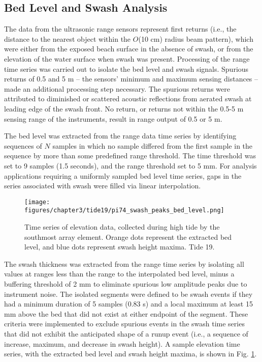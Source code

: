 \subsection{Bed Level and Swash Analysis}

The data from the ultrasonic range sensors represent first returns (i.e., the distance to the nearest object within the $O$(10 cm) radius beam pattern), which were either from the exposed beach surface in the absence of swash, or from the elevation of the water surface when swash was present. Processing of the range time series was carried out to isolate the bed level and swash signals. Spurious returns of 0.5 and 5 m -- the sensors' minimum and maximum sensing distances -- made an additional processing step necessary. The spurious returns were attributed to diminished or scattered acoustic reflections from aerated swash at leading edge of the swash front. No return, or returns not within the 0.5-5 m sensing range of the instruments, result in range output of 0.5 or 5 m. 

The bed level was extracted from the range data time series by identifying sequences of $N$ samples in which no sample differed from the first sample in the sequence by more than some predefined range threshold. The time threshold was set to 9 samples (1.5 seconds), and the range threshold set to 5 mm. For analysis applications requiring a uniformly sampled bed level time series, gaps in the series associated with swash were filled via linear interpolation. 

\begin{figure}[tbp] %
  	\texttt{[image: figures/chapter3/tide19/pi74\_swash\_peaks\_bed\_level.png]}
 	\caption[Bed level and swash height time series]{Time series of elevation data, collected during high tide by the southmost array element. Orange dots represent the extracted bed level, and blue dots represent swash height maxima. Tide 19. \label{fig:swash_peaks}}
\end{figure}

The swash thickness was extracted from the range time series by isolating all values at ranges less than the range to the interpolated bed level, minus a buffering threshold of 2 mm to eliminate spurious low amplitude peaks due to instrument noise. The isolated segments were defined to be swash events if they had a minimum duration of 5 samples (0.83 s) and a local maximum at least 15 mm above the bed that did not exist at either endpoint of the segment. These criteria were implemented to exclude spurious events in the swash time series that did not exhibit the anticipated shape of a runup event (i.e., a sequence of increase, maximum, and decrease in swash height). A sample elevation time series, with the extracted bed level and swash height maxima, is shown in Fig. \ref{fig:swash_peaks}.

